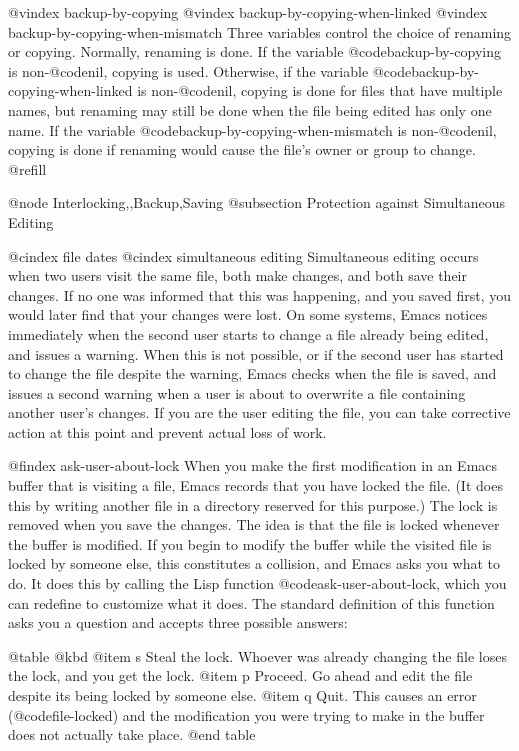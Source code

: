 {{{{{{{{{{{{{{{{{@vindex backup-by-copying
@vindex backup-by-copying-when-linked
@vindex backup-by-copying-when-mismatch
  Three variables control the choice of renaming or copying.
Normally, renaming is done.  If the variable @code{backup-by-copying} is
non-@code{nil}, copying is used.  Otherwise, if the variable
@code{backup-by-copying-when-linked} is non-@code{nil}, copying is
done for files that have multiple names, but renaming may still be done when
the file being edited has only one name.  If the variable
@code{backup-by-copying-when-mismatch} is non-@code{nil}, copying is
done if renaming would cause the file's owner or group to change.  @refill

@node Interlocking,,Backup,Saving
@subsection Protection against Simultaneous Editing

@cindex file dates
@cindex simultaneous editing
  Simultaneous editing occurs when two users visit the same file, both
make changes, and both save their changes.  If no one was informed that
this was happening, and you saved first, you would later find that your
changes were lost.  On some systems, Emacs notices immediately when the
second user starts to change a file already being edited, and issues a
warning.  When this is not possible, or if the second user has started
to change the file despite the warning, Emacs checks when the file is
saved, and issues a second warning when a user is about to overwrite a
file containing another user's changes.  If you are the user editing the
file, you can take corrective action at this point and prevent actual
loss of work.

@findex ask-user-about-lock
  When you make the first modification in an Emacs buffer that is visiting
a file, Emacs records that you have locked the file.  (It does this by
writing another file in a directory reserved for this purpose.)  The lock
is removed when you save the changes.  The idea is that the file is locked
whenever the buffer is modified.  If you begin to modify the buffer while
the visited file is locked by someone else, this constitutes a collision,
and Emacs asks you what to do.  It does this by calling the Lisp function
@code{ask-user-about-lock}, which you can redefine to customize what it
does.  The standard definition of this function asks you a
question and accepts three possible answers:

@table @kbd
@item s
Steal the lock.  Whoever was already changing the file loses the lock,
and you get the lock.
@item p
Proceed.  Go ahead and edit the file despite its being locked by someone else.
@item q
Quit.  This causes an error (@code{file-locked}) and the modification you
were trying to make in the buffer does not actually take place.
@end table

}}}}}}}}}}}}}}}}}
